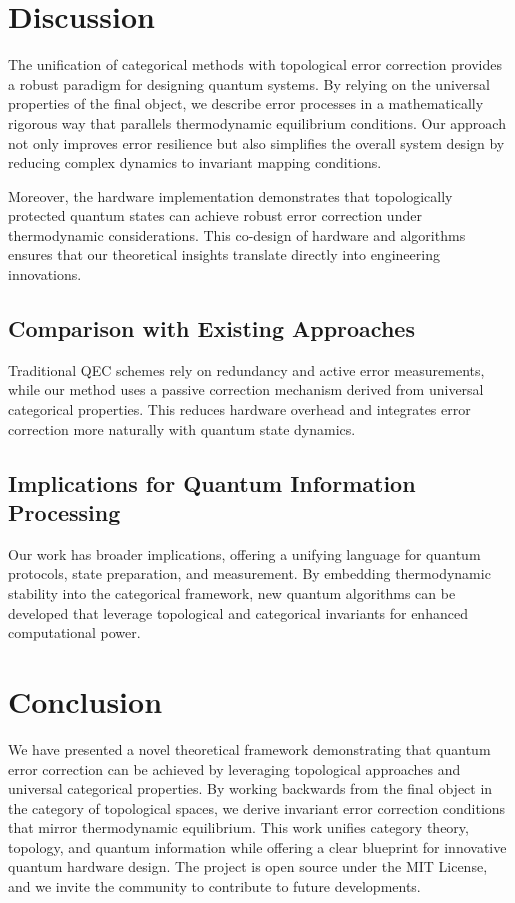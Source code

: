 \documentclass[11pt]{article}
\begin{document}
\section{Discussion}
\label{sec:discussion}
The unification of categorical methods with topological error correction provides a robust paradigm for designing quantum systems. By relying on the universal properties of the final object, we describe error processes in a mathematically rigorous way that parallels thermodynamic equilibrium conditions. Our approach not only improves error resilience but also simplifies the overall system design by reducing complex dynamics to invariant mapping conditions.

Moreover, the hardware implementation demonstrates that topologically protected quantum states can achieve robust error correction under thermodynamic considerations. This co-design of hardware and algorithms ensures that our theoretical insights translate directly into engineering innovations.

\subsection{Comparison with Existing Approaches}
Traditional QEC schemes rely on redundancy and active error measurements, while our method uses a passive correction mechanism derived from universal categorical properties. This reduces hardware overhead and integrates error correction more naturally with quantum state dynamics.

\subsection{Implications for Quantum Information Processing}
Our work has broader implications, offering a unifying language for quantum protocols, state preparation, and measurement. By embedding thermodynamic stability into the categorical framework, new quantum algorithms can be developed that leverage topological and categorical invariants for enhanced computational power.

\section{Conclusion}
\label{sec:conclusion}
We have presented a novel theoretical framework demonstrating that quantum error correction can be achieved by leveraging topological approaches and universal categorical properties. By working backwards from the final object in the category of topological spaces, we derive invariant error correction conditions that mirror thermodynamic equilibrium. This work unifies category theory, topology, and quantum information while offering a clear blueprint for innovative quantum hardware design. The project is open source under the MIT License, and we invite the community to contribute to future developments.
\end{document}
